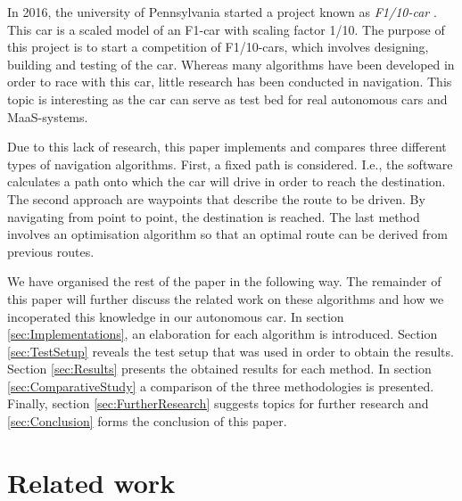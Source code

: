 \documentclass[conference,a4paper]{IEEEtran}
\begin{document}
In 2016, the university of Pennsylvania started a project known as \emph{F1/10-car} \cite{f1tenth}. This car is a scaled model of an F1-car with scaling factor 1/10. The purpose of this project is to start a competition of F1/10-cars, which involves designing, building and testing of the car. Whereas many algorithms have been developed in order to race with this car, little research has been conducted in navigation. This topic is interesting as the car can serve as test bed for real autonomous cars and MaaS-systems.

Due to this lack of research, this paper implements and compares three different types of navigation algorithms. First, a fixed path is considered. I.e., the software calculates a path onto which the car will drive in order to reach the destination. The second approach are waypoints that describe the route to be driven. By navigating from point to point, the destination is reached. The last method involves an optimisation algorithm so that an optimal route can be derived from previous routes.

We have organised the rest of the paper in the following way. The remainder of this paper will further discuss the related work on these algorithms and how we incoperated this knowledge in our autonomous car. In section \ref{sec:Implementations}, an elaboration for each algorithm is introduced. Section \ref{sec:TestSetup} reveals the test setup that was used in order to obtain the results. Section \ref{sec:Results} presents the obtained results for each method. In section \ref{sec:ComparativeStudy} a comparison of the three methodologies is presented. Finally, section \ref{sec:FurtherResearch} suggests topics for further research and \ref{sec:Conclusion} forms the conclusion of this paper.

\section{Related work}
\end{document}

